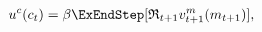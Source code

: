   \begin{equation}\begin{gathered}\begin{aligned}
        \uFunc^{c}(c_{t})  & = \DiscFac \ExEndStep [{\Rport}_{t+1} \vFunc^{m}_{t+1}(m_{t+1})] \label{eq:valfuncFOCRtilde},
      \end{aligned}\end{gathered}\end{equation}
